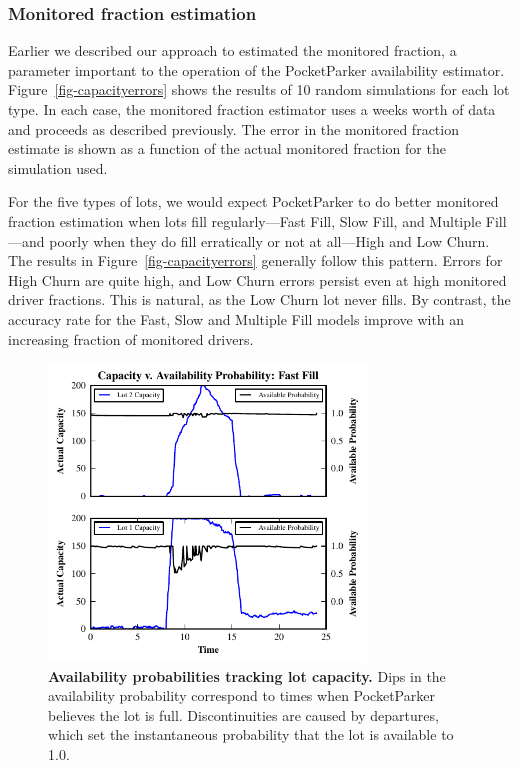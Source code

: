 \subsubsection{Monitored fraction estimation}

Earlier we described our approach to estimated the monitored fraction, a
parameter important to the operation of the PocketParker availability
estimator. Figure~\ref{fig-capacityerrors} shows the results of 10 random
simulations for each lot type. In each case, the monitored fraction estimator
uses a weeks worth of data and proceeds as described previously. The error in
the monitored fraction estimate is shown as a function of the actual
monitored fraction for the simulation used.

For the five types of lots, we would expect PocketParker to do better
monitored fraction estimation when lots fill regularly---Fast Fill, Slow
Fill, and Multiple Fill---and poorly when they do fill erratically or not at
all---High and Low Churn. The results in Figure~\ref{fig-capacityerrors}
generally follow this pattern. Errors for High Churn are quite high, and Low
Churn errors persist even at high monitored driver fractions. This is
natural, as the Low Churn lot never fills.  By contrast, the accuracy rate for
the Fast, Slow and Multiple Fill models improve with an increasing fraction of
monitored drivers.

\begin{figure}[t]
\centering
\includegraphics[width=3.325in]{./simulator/figures/tracking_fastfill.pdf}

\caption{\textbf{Availability probabilities tracking lot capacity.} Dips in
the availability probability correspond to times when PocketParker believes
the lot is full. Discontinuities are caused by departures, which set the
instantaneous probability that the lot is available to 1.0.}

\label{fig-trackingexample}
\end{figure}

